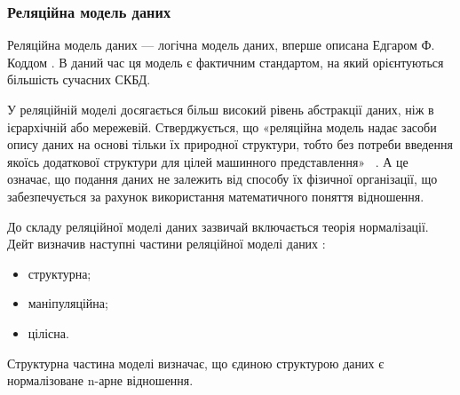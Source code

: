 \subsubsection{Реляційна модель даних}\label{subsection:relationModel}

Реляційна модель даних — логічна модель даних, вперше описана Едгаром Ф. Коддом \cite{codd1970relational}. В даний час ця модель є фактичним стандартом, на який орієнтуються більшість сучасних СКБД.

У реляційній моделі досягається більш високий рівень абстракції даних, ніж в ієрархічній або мережевій. Стверджується, що «реляційна модель надає засоби опису даних на основі тільки їх природної структури, тобто без потреби введення якоїсь додаткової структури для цілей машинного представлення»~ \cite{codd1970relational}. А це означає, що подання даних не залежить від способу їх фізичної організації, що забезпечується за рахунок використання математичного поняття відношення.

До складу реляційної моделі даних зазвичай включається теорія нормалізації. Дейт визначив наступні частини реляційної моделі даних \cite{дейт2008введение}:
\begin{itemize}
	\item структурна;
	\item маніпуляційна;
	\item цілісна.
\end{itemize}

Структурна частина моделі визначає, що єдиною структурою даних є нормалізоване n-арне відношення.
